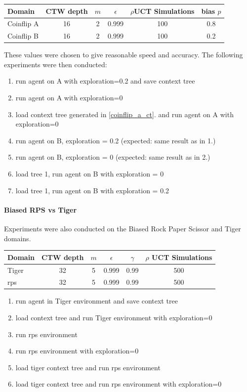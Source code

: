 \documentclass[paper=a4, fontsize=11pt]{scrartcl} %
\numberwithin{equation}{section} %
\numberwithin{figure}{section} %
\numberwithin{table}{section} %
\begin{document}
\bigskip

\begin{tabular}{|l|c|c|c|c|c|}
\hline
Domain & CTW depth & $m$ & $\epsilon$ & $\rho$UCT Simulations & bias $p$\\\hline
Coinflip A & 16 & 2 & 0.999 & 100 & 0.8\\
Coinflip B & 16 & 2 & 0.999 & 100 & 0.2\\\hline
\end{tabular}

\bigskip

These values were chosen to give reasonable speed and accuracy. The following experiments were then conducted:

\begin{enumerate}
 \setlength{\itemsep}{0cm}%
  \setlength{\parskip}{0cm}%
\item run agent on A with exploration=0.2 and save context tree\label{coinflip_a_ct}
\item run agent on A with exploration=0
\item load context tree generated in \ref{coinflip_a_ct}. and run agent on A with exploration=0
\item run agent on B, exploration = 0.2 (expected: same result as in 1.)
\item run agent on B, exploration = 0 (expected: same result as in 2.)
\item load tree 1, run agent on B with exploration = 0
\item load tree 1, run agent on B with exploration = 0.2
\end{enumerate}

\paragraph{Biased RPS vs Tiger}
Experiments were also conducted on the Biased Rock Paper Scissor and Tiger domains.

\bigskip

\begin{tabular}{|l|c|c|c|c|c|}
\hline
Domain & CTW depth & $m$ & $\epsilon$ &$\gamma $ & $\rho$ UCT Simulations\\\hline
Tiger & 32 & 5 & 0.999 & 0.99 & 500\\
rps & 32 & 5 & 0.999 & 0.99 & 500\\\hline
\end{tabular}

\bigskip

\begin{enumerate}
 \setlength{\itemsep}{0cm}%
  \setlength{\parskip}{0cm}%
\item run agent in Tiger environment and save context tree
\item load context tree and run Tiger environment with exploration=0
\item run rps environment
\item run rps environment with exploration=0
\item load tiger context tree and run rps environment 
\item load tiger context tree and run rps environment with exploration=0
\end{enumerate}
\end{document}
